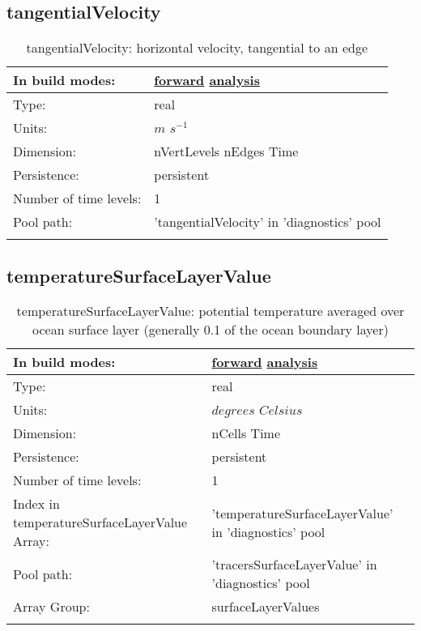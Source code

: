 \subsection[tangentialVelocity]{tangentialVelocity}
\label{subsec:var_sec_diagnostics_tangentialVelocity}
\begin{center}
\begin{longtable}{| p{2.0in} | p{4.0in} |}
        \hline 
        In build modes: & \hyperref[subsec:forward_var_tab_diagnostics]{forward} \hyperref[subsec:analysis_var_tab_diagnostics]{analysis} \\
        \hline 
        Type: & real \\
        \hline 
        Units: & $m$ $s^{-1}$ \\
        \hline 
        Dimension: & nVertLevels nEdges Time \\
        \hline 
        Persistence: & persistent \\
        \hline 
        Number of time levels: & 1 \\
        \hline 
            Pool path: & 'tangentialVelocity' in 'diagnostics' pool
 \\
		 \hline 
    \caption{tangentialVelocity: horizontal velocity, tangential to an edge}
\end{longtable}
\end{center}
\subsection[temperatureSurfaceLayerValue]{temperatureSurfaceLayerValue}
\label{subsec:var_sec_diagnostics_temperatureSurfaceLayerValue}
\begin{center}
\begin{longtable}{| p{2.0in} | p{4.0in} |}
        \hline 
        In build modes: & \hyperref[subsec:forward_var_tab_diagnostics]{forward} \hyperref[subsec:analysis_var_tab_diagnostics]{analysis} \\
        \hline 
        Type: & real \\
        \hline 
        Units: & $degrees$ $Celsius$ \\
        \hline 
        Dimension: & nCells Time \\
        \hline 
        Persistence: & persistent \\
        \hline 
        Number of time levels: & 1 \\
        \hline 
		 Index in temperatureSurfaceLayerValue Array: & 'temperatureSurfaceLayerValue' in 'diagnostics' pool \\
		 \hline 
            Pool path: & 'tracersSurfaceLayerValue' in 'diagnostics' pool
 \\
		 \hline 
		 Array Group: & surfaceLayerValues \\
		 \hline 
    \caption{temperatureSurfaceLayerValue: potential temperature averaged over ocean surface layer (generally 0.1 of the ocean boundary layer)}
\end{longtable}
\end{center}
